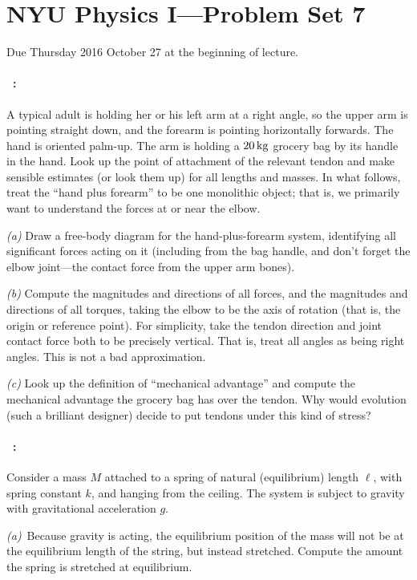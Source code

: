 \documentclass[12pt]{article}
\begin{document}
\section*{NYU Physics I---Problem Set 7}

Due Thursday 2016 October 27 at the beginning of lecture.

\paragraph{\problemname~\theproblem:}%
A typical adult is holding her or his left arm at a right angle, so the
upper arm is pointing straight down, and the forearm is pointing
horizontally forwards.  The hand is oriented palm-up.  The arm is holding a
$20\,\mathrm{kg}$ grocery bag by its handle in the hand.  Look up the
point of attachment of the relevant tendon and make sensible estimates
(or look them up) for all lengths and masses.  In what follows, treat
the ``hand plus forearm'' to be one monolithic object; that is, we
primarily want to understand the forces at or near the elbow.

\textsl{(a)} Draw a free-body diagram for the hand-plus-forearm
system, identifying all significant forces acting on it (including
from the bag handle, and don't forget the elbow joint---the contact
force from the upper arm bones).

\textsl{(b)} Compute the magnitudes and directions of all forces, and
the magnitudes and directions of all torques, taking the elbow to be
the axis of rotation (that is, the origin or reference point).  For
simplicity, take the tendon direction and joint contact force both to
be precisely vertical.  That is, treat all angles as being right
angles.  This is not a bad approximation.

\textsl{(c)} Look up the definition of ``mechanical advantage'' and
compute the mechanical advantage the grocery bag has over the tendon.
Why would evolution (such a brilliant designer) decide to put tendons
under this kind of stress?

\paragraph{\problemname~\theproblem:}%
Consider a mass $M$ attached to a spring of natural (equilibrium)
length $\ell$, with spring constant $k$, and hanging from the
ceiling. The system is subject to gravity with gravitational
acceleration $g$.

\textsl{(a)}~Because gravity is acting, the equilibrium position of
the mass will not be at the equilibrium length of the string, but
instead stretched. Compute the amount the spring is stretched at
equilibrium.
\end{document}
